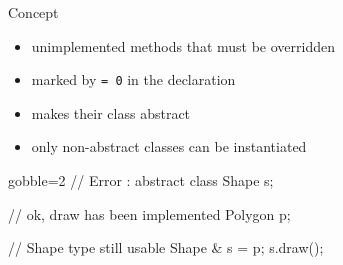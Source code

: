 \begin{frame}[fragile]
  \begin{block}{Concept}
    \begin{itemize}
    \item unimplemented methods that must be overridden
    \item marked by \texttt{= 0} in the declaration
    \item makes their class abstract
    \item only non-abstract classes can be instantiated
    \end{itemize}
  \end{block}
  \pause
  \begin{multicols}{2}
    \begin{cppcode*}{gobble=2}
      // Error : abstract class
      Shape s;

      // ok, draw has been implemented
      Polygon p;

      // Shape type still usable
      Shape & s = p;
      s.draw();
    \end{cppcode*}
    \columnbreak
  \end{multicols}
\end{frame}

